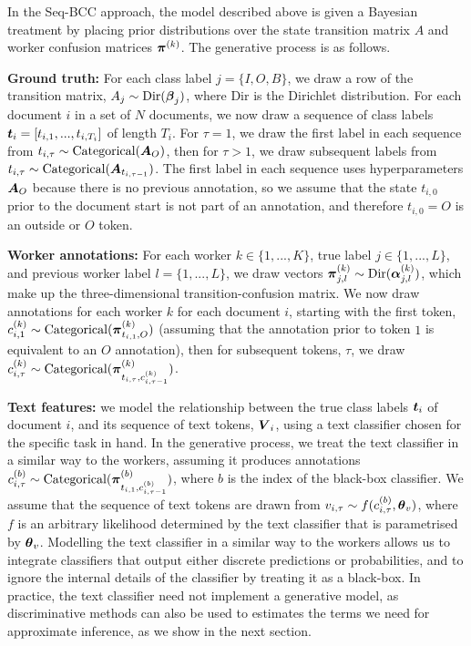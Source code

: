 In the Seq-BCC approach, the model described above is given a Bayesian treatment by placing prior distributions over the state transition matrix $A$ and worker confusion matrices $\boldsymbol\pi^{(k)}$. The generative process is as follows. 

\textbf{Ground truth:} For each class label $j=\{I, O, B\}$, we draw a row of the transition matrix, $A_j \sim \mathrm{Dir}(\boldsymbol\beta_j)$, where $\mathrm{Dir}$ is the Dirichlet distribution. 
For each document $i$ in a set of $N$ documents, we now draw a sequence of class labels $\boldsymbol t_i = [t_{i,1}, ..., t_{i, T_i}]$ of length $T_i$. For $\tau=1$, we draw the first label in each sequence from 
$t_{i,\tau} \sim \mathrm{Categorical}(\boldsymbol A_{O})$, 
then for $\tau > 1$, we draw subsequent labels from $t_{i,\tau} \sim \mathrm{Categorical}(\boldsymbol A_{t_{i,\tau-1}})$. The first label in each sequence uses hyperparameters $\boldsymbol A_{O}$ because there is no previous annotation, so we assume that the state $t_{i,0}$ prior to the document start is not part of an annotation, and therefore $t_{i,0}=O$ is an outside or $O$ token. 

\textbf{Worker annotations:} For each worker $k\in\{1,...,K\}$, true label $j\in\{1,...,L\}$, and previous worker label $l=\{1,...,L\}$, we draw vectors $\boldsymbol\pi_{j,l}^{(k)} \sim \mathrm{Dir}(\boldsymbol\alpha^{(k)}_{j,l})$, which make up the three-dimensional transition-confusion matrix. We now draw annotations for each worker $k$ for each document $i$, starting with the first token, $c_{i,1}^{(k)} \sim \mathrm{Categorical}( \boldsymbol\pi^{(k)}_{t_{i,1}, O} )$ (assuming that the annotation prior to token $1$ is equivalent to an $O$ annotation), then for subsequent tokens, $\tau$, we draw $c_{i,\tau}^{(k)} \sim \mathrm{Categorical}( \boldsymbol\pi^{(k)}_{t_{i,\tau}, c_{i,\tau-1}^{(k)}} )$.

\textbf{Text features:} 
we model the relationship between the true class labels $\boldsymbol t_i$ of document $i$, 
and its sequence of text tokens, $\boldsymbol V_i$,
using a text classifier chosen for the specific task in hand. 
In the generative process, we treat the text classifier in a similar way to the workers,
assuming it produces annotations $c_{i,\tau}^{(b)} \sim \mathrm{Categorical}( \boldsymbol\pi^{(b)}_{t_{i,1}, c_{i,\tau-1}^{(b)}})$,
where $b$ is the index of the black-box classifier. 
We assume that the sequence of text tokens are drawn from $v_{i,\tau} \sim f(c_{i,\tau}^{(b)}, \boldsymbol \theta_v)$,
where $f$ is an arbitrary likelihood determined by the text classifier that is parametrised by $\boldsymbol \theta_v$.
Modelling the text classifier in a similar way to the workers allows us to integrate classifiers that
output either discrete predictions or probabilities, 
and to ignore the internal details of the classifier by treating it as a black-box.
In practice, the text classifier need not implement a generative model, as discriminative methods can also be used
to estimates the terms we need for approximate inference, as we show in the next section.


